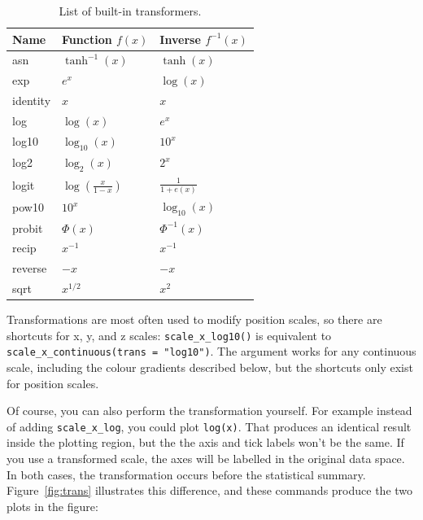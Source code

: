 \begin{table}
  \centering
  \begin{tabular}{lll}
    \toprule
    Name & Function $f(x)$ & Inverse $f^{-1}(x)$ \\
    \midrule
    asn       & $\tanh^{-1}(x)$ & $\tanh(x)$ \\
    exp       & $e ^ x$         & $\log(x)$  \\
    identity  & $x$             & $x$        \\
    log       & $\log(x)$       & $e ^ x$    \\
    log10     & $\log_{10}(x)$  & $10 ^ x$   \\
    log2      & $\log_2(x)$     & $2 ^ x$    \\
    logit     & $\log(\frac{x}{1 - x})$ & $\frac{1}{1 + e(x)} $ \\
    pow10     & $10^x$          & $\log_{10}(x) $ \\
    probit    & $\Phi(x)$       & $\Phi^{-1}(x)$ \\
    recip     & $x^{-1}$        & $x^{-1}$ \\
    reverse   & $-x$            & $-x$     \\
    sqrt      & $x^{1/2}$       & $x ^ 2$  \\
    \bottomrule
  \end{tabular}
  \caption{List of built-in transformers.}
  \label{tbl:common-trans}
\end{table}

Transformations are most often used to modify position scales, so there are shortcuts for x, y, and z scales: \verb|scale_x_log10()| is equivalent to \verb|scale_x_continuous(trans = "log10")|.  The  argument works for any continuous scale, including the colour gradients described below, but the shortcuts only exist for position scales.

Of course, you can also perform the transformation yourself.  For example instead of adding {\tt scale\_x\_log}, you could plot {\tt log(x)}.  That produces an identical result inside the plotting region, but the the axis and tick labels won't be the same.  If you use a transformed scale, the axes will be labelled in the original data space. In both cases, the transformation occurs before the statistical summary. Figure~\ref{fig:trans} illustrates this difference, and these commands produce the two plots in the figure:

% 


